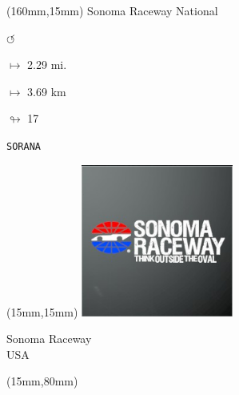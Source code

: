 \begin{textblock*}{40mm}(160mm,15mm)%
Sonoma Raceway National
\par \Huge$\circlearrowleft$
\Large
\par$\mapsto$ 2.29 mi.
\par$\mapsto$ 3.69 km
\par$\looparrowright$ 17
\par\hfill\tiny\tt SORANA\\
\end{textblock*}
\null\newpage

\begin{textblock*}{50mm}(15mm,15mm)%
\includegraphics[width=50mm]{LG/2015-05-20_00096.png}
\par Sonoma Raceway\\ USA
\end{textblock*}
\begin{textblock*}{185mm}(15mm,80mm)%
\end{textblock*}
